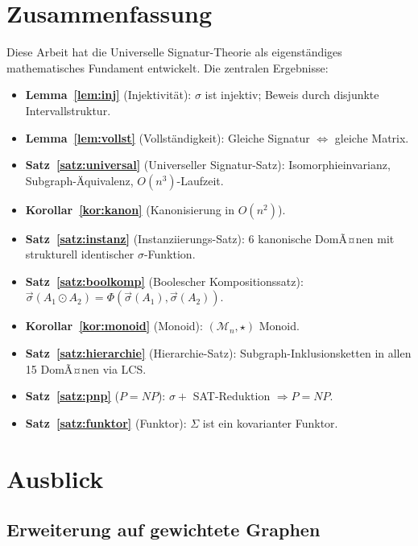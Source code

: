 ﻿\documentclass[a4paper,12pt]{article}
\theoremstyle{definition}
\begin{document}
\section{Zusammenfassung}

Diese Arbeit hat die Universelle Signatur-Theorie als eigenst\"andiges
mathematisches Fundament entwickelt. Die zentralen Ergebnisse:

\begin{itemize}
    \item \textbf{Lemma~\ref{lem:inj}} (Injektivit\"at): $\sigma$ ist injektiv;
          Beweis durch disjunkte Intervallstruktur.
    \item \textbf{Lemma~\ref{lem:vollst}} (Vollst\"andigkeit): Gleiche Signatur
          $\Leftrightarrow$ gleiche Matrix.
    \item \textbf{Satz~\ref{satz:universal}} (Universeller Signatur-Satz):
          Isomorphieinvarianz, Subgraph-\"Aquivalenz, $O(n^3)$-Laufzeit.
    \item \textbf{Korollar~\ref{kor:kanon}} (Kanonisierung in $O(n^2)$).
    \item \textbf{Satz~\ref{satz:instanz}} (Instanziierungs-Satz):
          6 kanonische DomÃ¤nen mit strukturell identischer $\sigma$-Funktion.
    \item \textbf{Satz~\ref{satz:boolkomp}} (Boolescher Kompositionssatz):
          $\vec{\sigma}(A_1 \odot A_2) = \Phi(\vec{\sigma}(A_1), \vec{\sigma}(A_2))$.
    \item \textbf{Korollar~\ref{kor:monoid}} (Monoid): $(\mathcal{M}_n, \star)$ Monoid.
    \item \textbf{Satz~\ref{satz:hierarchie}} (Hierarchie-Satz):
          Subgraph-Inklusionsketten in allen 15 DomÃ¤nen via LCS.
    \item \textbf{Satz~\ref{satz:pnp}} ($P=NP$): $\sigma + $ SAT-Reduktion
          $\Rightarrow P = NP$.
    \item \textbf{Satz~\ref{satz:funktor}} (Funktor): $\Sigma$ ist ein
          kovarianter Funktor.
\end{itemize}

\section{Ausblick}

\subsection{Erweiterung auf gewichtete Graphen}
\end{document}

